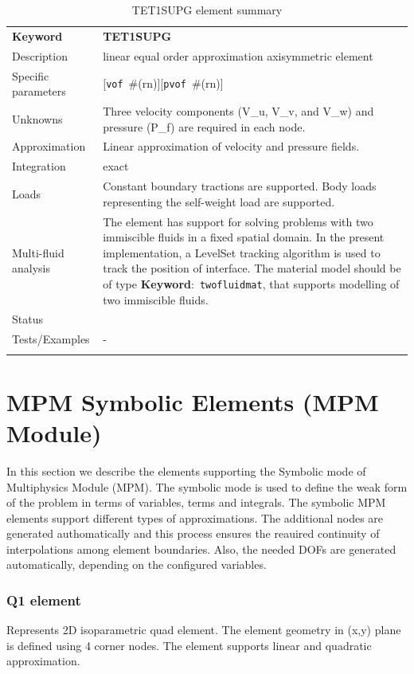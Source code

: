 \documentclass[a4paper]{article}
\newcommand{\descitem}[1]{{\noindent \textbf{#1}}:}
\newcommand{\elemkeyword}[1]{\descitem{Keyword}~\param{#1}} %
\newcommand{\param}[1]{\texttt{#1}} %
\newcommand{\optional}[1]{[#1]} %
\newcommand{\field}[2]{\param{#1}~\#{\tiny(#2)}} %
\newcommand{\optField}[2]{\optional{\field{#1}{#2}}}
\newcommand{\templabel}{}%
\newcommand{\tempcaption}{}%
\newcounter{nelpar}
\newenvironment{elementsummary}[5]{%
  \gdef\tempcaption{#4}%
  \gdef\templabel{#5}%
  \setcounter{nelpar}{0}%
  \begin{center} %
    \begin{table}[!htb] %
      \begin{tabular}{|l|p{9cm}|}\hline %
        {\bf Keyword} & \bf{#1}\\ %
        {Description} & {#2}\\ %
        {Specific parameters} & {#3}\\ \hline %
}{
  \\ \hline %
      \end{tabular}%
      \caption{\tempcaption}%
      \label{\templabel}%
    \end{table}%
  \end{center}%
}
\newcommand{\elementDescription}[2]{{#1} & {#2}\\}
\begin{document}
\begin{elementsummary}{TET1SUPG}{linear equal order approximation axisymmetric element}
  {\optField{vof}{rn}\optField{pvof}{rn}}{TET1SUPG element summary}{TET1SUPGsummary}
\elementDescription{Unknowns}{Three velocity components (V\_u, V\_v, and V\_w) and pressure (P\_f) are required in each node.}
\elementDescription{Approximation}{Linear approximation of velocity and pressure fields.}
\elementDescription{Integration}{exact}
\elementDescription{Loads}{Constant boundary tractions are supported. Body loads
representing the self-weight load are supported.}
\elementDescription{Multi-fluid analysis}{The element has support for solving
problems with two immiscible fluids in
a fixed spatial domain. In the present implementation, a LevelSet tracking algorithm
is used to track the position of interface. 
The material model should be of type \elemkeyword{twofluidmat}, that
supports modelling of two immiscible fluids.}
\elementDescription{Status}{}
\elementDescription{Tests/Examples}{-}
\end{elementsummary}


\clearpage
\section{MPM Symbolic Elements (MPM Module)}
In this section we describe the elements supporting the Symbolic mode of Multiphysics Module (MPM).
The symbolic mode is used to define the weak form of the problem in terms of variables, terms and integrals.
The symbolic MPM elements support different types of approximations. The additional nodes are generated authomatically and this process ensures the reauired continuity of interpolations among element boundaries.
Also, the needed DOFs are generated automatically, depending on the configured variables.  

\subsubsection{Q1 element}
\label{Q1}

Represents 2D  isoparametric quad element. The element geometry in (x,y) plane is defined using 
4 corner nodes. The element supports linear and quadratic approximation. 
\end{document}
